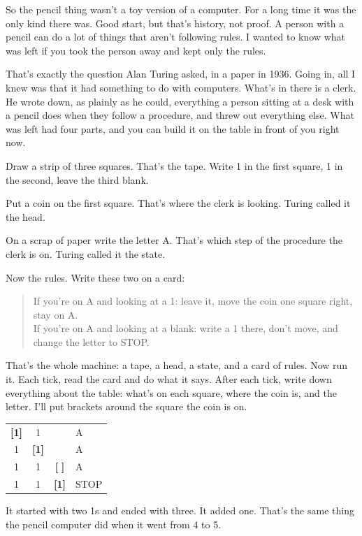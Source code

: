 \documentclass[11pt,twoside]{article}
\theoremstyle{thielethm}
\theoremstyle{thieledef}
\theoremstyle{thieledef}
\theoremstyle{thieledef}
\theoremstyle{thielethm}
\theoremstyle{thieleobs}
\theoremstyle{thielethm}
\begin{document}
So the pencil thing wasn't a toy version of a computer. For a long time it was the only kind there was. Good start, but that's history, not proof. A person with a pencil can do a lot of things that aren't following rules. I wanted to know what was left if you took the person away and kept only the rules.

That's exactly the question Alan Turing asked, in a paper in 1936. Going in, all I knew was that it had something to do with computers. What's in there is a clerk. He wrote down, as plainly as he could, everything a person sitting at a desk with a pencil does when they follow a procedure, and threw out everything else. What was left had four parts, and you can build it on the table in front of you right now.

Draw a strip of three squares. That's the tape. Write 1 in the first square, 1 in the second, leave the third blank.

Put a coin on the first square. That's where the clerk is looking. Turing called it the head.

On a scrap of paper write the letter A. That's which step of the procedure the clerk is on. Turing called it the state.

Now the rules. Write these two on a card:

\begin{quote}
If you're on A and looking at a 1: leave it, move the coin one square right, stay on A.\\
If you're on A and looking at a blank: write a 1 there, don't move, and change the letter to STOP.
\end{quote}

That's the whole machine: a tape, a head, a state, and a card of rules. Now run it. Each tick, read the card and do what it says. After each tick, write down everything about the table: what's on each square, where the coin is, and the letter. I'll put brackets around the square the coin is on.

\begin{center}
\begin{tabular}{cccl}
\textbf{[1]} & 1 & \textvisiblespace & A\\
1 & \textbf{[1]} & \textvisiblespace & A\\
1 & 1 & \textbf{[\,\textvisiblespace\,]} & A\\
1 & 1 & \textbf{[1]} & STOP
\end{tabular}
\end{center}

It started with two 1s and ended with three. It added one. That's the same thing the pencil computer did when it went from 4 to 5.
\end{document}
